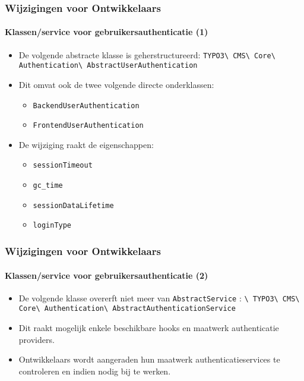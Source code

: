 \begin{frame}[fragile]
	\frametitle{Wijzigingen voor Ontwikkelaars}
	\framesubtitle{Klassen/service voor gebruikersauthenticatie (1)}

	\begin{itemize}
		\item De volgende abstracte klasse is geherstructureerd:\newline
			\small\texttt{TYPO3\textbackslash
				CMS\textbackslash
				Core\textbackslash
				Authentication\textbackslash
				AbstractUserAuthentication}\normalsize
		\item Dit omvat ook de twee volgende directe onderklassen:

			\begin{itemize}
				\item \texttt{BackendUserAuthentication}
				\item \texttt{FrontendUserAuthentication}
			\end{itemize}

		\item De wijziging raakt de eigenschappen:

			\begin{itemize}
				\item \texttt{sessionTimeout}
				\item \texttt{gc\_time}
				\item \texttt{sessionDataLifetime}
				\item \texttt{loginType}
			\end{itemize}

	\end{itemize}

\end{frame}


\begin{frame}[fragile]
	\frametitle{Wijzigingen voor Ontwikkelaars}
	\framesubtitle{Klassen/service voor gebruikersauthenticatie (2)}

	\begin{itemize}

		\item De volgende klasse overerft niet meer van
			\smaller\texttt{AbstractService}\normalsize\hspace{0.1cm}
			:
			\smaller\texttt{\textbackslash
				TYPO3\textbackslash
				CMS\textbackslash
				Core\textbackslash
				Authentication\textbackslash
				AbstractAuthenticationService}\normalsize

		\item Dit raakt mogelijk enkele beschikbare hooks en maatwerk authenticatie providers.

		\item Ontwikkelaars wordt aangeraden hun maatwerk authenticatieservices te controleren
			en indien nodig bij te werken.

	\end{itemize}

\end{frame}

